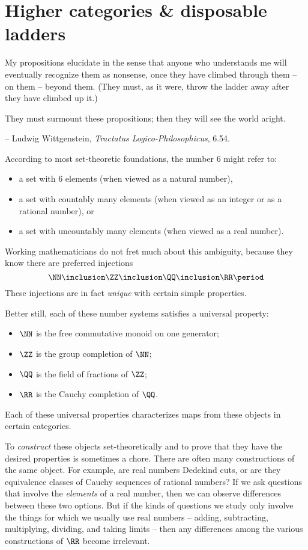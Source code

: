 
\chapter*{Higher categories \& disposable ladders}%
\label{cha:introduction}

\epigraph{
  My propositions elucidate in the sense that anyone who understands me will eventually recognize them as nonsense, once they have climbed through them -- on them -- beyond them.
  (They must, as it were, throw the ladder away after they have climbed up it.)

  They must surmount these propositions;
  then they will see the world aright.
}{-- Ludwig Wittgenstein, \textit{Tractatus Logico-Philosophicus}, 6.54.}

\noindent%
According to most set-theoretic foundations,
the number $6$ might refer to:
\begin{itemize}
  \item a set with $6$ elements (when viewed as a natural number),
  \item a set with countably many elements (when viewed as an integer or as a rational number), or
  \item a set with uncountably many elements (when viewed as a real number).
\end{itemize}
Working mathematicians do not fret much about this ambiguity, because they know there are preferred injections
\[
  \NN \inclusion \ZZ \inclusion \QQ \inclusion \RR \period
\]
These injections are in fact \emph{unique} with certain simple properties.

Better still, each of these number systems satisfies a universal property:
\begin{itemize}
  \item $\NN$ is the free commutative monoid on one generator;
  \item $\ZZ$ is the group completion of $\NN$;
  \item $\QQ$ is the field of fractions of $\ZZ$;
  \item $\RR$ is the Cauchy completion of $\QQ$.
\end{itemize}
Each of these universal properties characterizes maps from these objects in certain categories.

To \emph{construct} these objects set-theoretically and to prove that they have the desired properties is sometimes a chore.
There are often many constructions of the same object.
For example, are real numbers Dedekind cuts, or are they equivalence classes of Cauchy sequences of rational numbers?
If we ask questions that involve the \emph{elements} of a real number, then we can observe differences between these two options. 
But if the kinds of questions we study only involve the things for which we usually use real numbers -- adding, subtracting, multiplying, dividing, and taking limits -- then any differences among the various constructions of $\RR$ become irrelevant.

